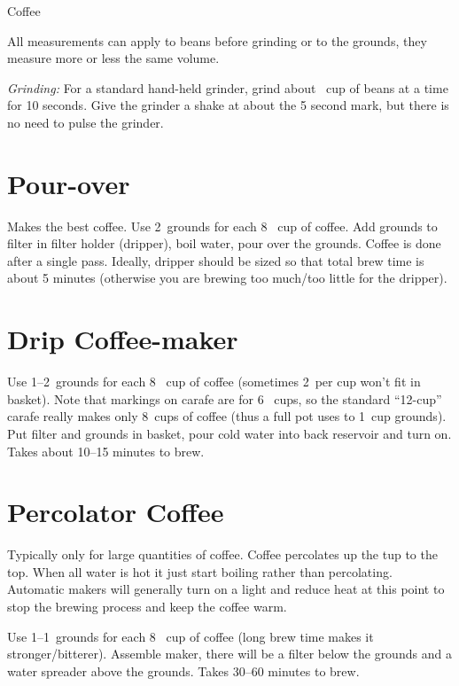 
\begin{recipe}{Coffee}%
  \maketitle

  All measurements can apply to beans before grinding or to the grounds,
  they measure more or less the same volume.

  \textsl{Grinding:} For a standard hand-held grinder, grind about
  \half~cup of beans at a time for 10 seconds. Give the grinder a shake at
  about the 5 second mark, but there is no need to pulse the grinder.

  \section{Pour-over}
  Makes the best coffee. Use 2~\T grounds for each {8~\oz} {cup} of coffee.
  Add grounds to filter in filter holder (dripper), boil water, pour over
  the grounds. Coffee is done after a single pass. Ideally, dripper should
  be sized so that total brew time is about 5 minutes (otherwise you are
  brewing too much/too little for the dripper).

  \section{Drip Coffee-maker}
  Use 1--2~\T grounds for each {8~\oz} {cup} of coffee (sometimes 2~\T per
  cup won't fit in basket). Note that markings on carafe are for 6~\oz
  cups, so the standard ``12-cup'' carafe really makes only 8~cups of
  coffee (thus a full pot uses \half to 1~cup grounds). Put filter and
  grounds in basket, pour cold water into back reservoir and turn on. Takes
  about 10--15 minutes to brew.

  \section{Percolator Coffee}
  Typically only for large quantities of coffee. Coffee percolates up the
  tup to the top. When all water is hot it just start boiling rather than
  percolating. Automatic makers will generally turn on a light and reduce
  heat at this point to stop the brewing process and keep the coffee warm.

  Use 1--1\half~\T grounds for each {8~\oz} {cup} of coffee (long brew time
  makes it stronger/bitterer). Assemble maker, there will be a filter below
  the grounds and a water spreader above the grounds. Takes 30--60 minutes
  to brew.

\end{recipe}

